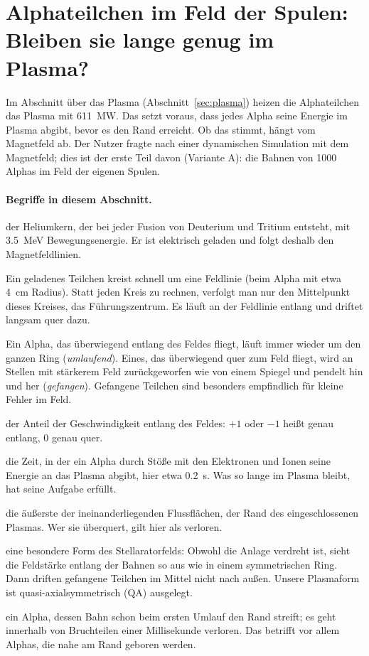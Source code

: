 \section{Alphateilchen im Feld der Spulen: Bleiben sie lange genug im Plasma?}\label{sec:alpha}

Im Abschnitt über das Plasma (Abschnitt~\ref{sec:plasma}) heizen die Alphateilchen das Plasma mit \SI{611}{MW}. Das
setzt voraus, dass jedes Alpha seine Energie im Plasma abgibt, bevor es den Rand erreicht. Ob das stimmt, hängt vom
Magnetfeld ab. Der Nutzer fragte nach einer dynamischen Simulation mit dem Magnetfeld; dies ist der erste Teil davon
(Variante A): die Bahnen von 1000 Alphas im Feld der eigenen Spulen.

\paragraph{Begriffe in diesem Abschnitt.}
\begin{description}\itemsep2pt
\item[Alphateilchen] der Heliumkern, der bei jeder Fusion von Deuterium und Tritium entsteht, mit \SI{3,5}{MeV}
  Bewegungsenergie. Er ist elektrisch geladen und folgt deshalb den Magnetfeldlinien.
\item[Führungszentrum] Ein geladenes Teilchen kreist schnell um eine Feldlinie (beim Alpha mit etwa \SI{4}{cm}
  Radius). Statt jeden Kreis zu rechnen, verfolgt man nur den Mittelpunkt dieses Kreises, das Führungszentrum. Es
  läuft an der Feldlinie entlang und driftet langsam quer dazu.
\item[umlaufend und gefangen] Ein Alpha, das überwiegend entlang des Feldes fliegt, läuft immer wieder um den ganzen
  Ring (\emph{umlaufend}). Eines, das überwiegend quer zum Feld fliegt, wird an Stellen mit stärkerem Feld
  zurückgeworfen wie von einem Spiegel und pendelt hin und her (\emph{gefangen}). Gefangene Teilchen sind besonders
  empfindlich für kleine Fehler im Feld.
\item[$v_\parallel/v$] der Anteil der Geschwindigkeit entlang des Feldes: $+1$ oder $-1$ heißt genau entlang,
  $0$ genau quer.
\item[Abbremszeit] die Zeit, in der ein Alpha durch Stöße mit den Elektronen und Ionen seine Energie an das Plasma
  abgibt, hier etwa \SI{0,2}{s}. Was so lange im Plasma bleibt, hat seine Aufgabe erfüllt.
\item[letzte geschlossene Fläche] die äußerste der ineinanderliegenden Flussflächen, der Rand des eingeschlossenen
  Plasmas. Wer sie überquert, gilt hier als verloren.
\item[Quasisymmetrie] eine besondere Form des Stellaratorfelds: Obwohl die Anlage verdreht ist, sieht die Feldstärke
  entlang der Bahnen so aus wie in einem symmetrischen Ring. Dann driften gefangene Teilchen im Mittel nicht nach
  außen. Unsere Plasmaform ist quasi-axialsymmetrisch (QA) ausgelegt.
\item[Prompter Verlust] ein Alpha, dessen Bahn schon beim ersten Umlauf den Rand streift; es geht innerhalb von
  Bruchteilen einer Millisekunde verloren. Das betrifft vor allem Alphas, die nahe am Rand geboren werden.
\end{description}


